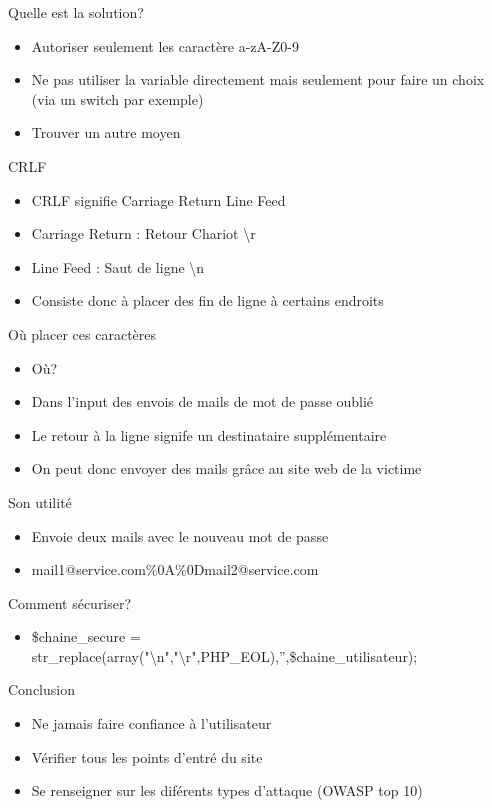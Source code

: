 \documentclass{beamer}
\begin{document}
\begin{frame}{Quelle est la solution?}
	\begin{itemize}
		\item Autoriser seulement les caractère a-zA-Z0-9
		\item Ne pas utiliser la variable directement mais seulement pour faire un choix (via un switch par exemple)
		\item Trouver un autre moyen
	\end{itemize}
\end{frame}

\begin{frame}{CRLF}
	\begin{itemize}
		\item CRLF signifie Carriage Return Line Feed
		\item Carriage Return : Retour Chariot \textbackslash r
		\item Line Feed : Saut de ligne \textbackslash n
		\item Consiste donc à placer des fin de ligne à certains endroits
	\end{itemize}
\end{frame}

\begin{frame}{Où placer ces caractères}
	\begin{itemize}
		\item Où?
		\item Dans l'input des envois de mails de mot de passe oublié
		\item Le retour à la ligne signife un destinataire supplémentaire
		\item On peut donc envoyer des mails grâce au site web de la victime
	\end{itemize}
\end{frame}

\begin{frame}{Son utilité}
	\begin{itemize}
		\item Envoie deux mails avec le nouveau mot de passe
		\item mail1@service.com\%0A\%0Dmail2@service.com
	\end{itemize}
\end{frame}

\begin{frame}{Comment sécuriser?}
	\begin{itemize}
		\item \$chaine\_secure = str\_replace(array("\textbackslash n","\textbackslash r",PHP\_EOL),'',\$chaine\_utilisateur);	
	\end{itemize}
\end{frame}

\begin{frame}{Conclusion}
	\begin{itemize}
		\item Ne jamais faire confiance à l'utilisateur
		\item Vérifier tous les points d'entré du site
		\item Se renseigner sur les diférents types d'attaque (OWASP top 10)
	\end{itemize}
\end{frame}
\end{document}
